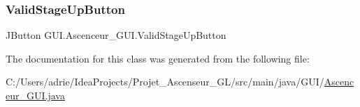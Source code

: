 \subsubsection{\texorpdfstring{ValidStageUpButton}{ValidStageUpButton}}
{\footnotesize\ttfamily J\+Button G\+U\+I.\+Ascenceur\+\_\+\+G\+U\+I.\+Valid\+Stage\+Up\+Button\hspace{0.3cm}{\ttfamily [private]}}



The documentation for this class was generated from the following file\+:\begin{DoxyCompactItemize}
\item 
C\+:/\+Users/adrie/\+Idea\+Projects/\+Projet\+\_\+\+Ascenseur\+\_\+\+G\+L/src/main/java/\+G\+U\+I/\mbox{\hyperlink{_ascenceur___g_u_i_8java}{Ascenceur\+\_\+\+G\+U\+I.\+java}}\end{DoxyCompactItemize}
